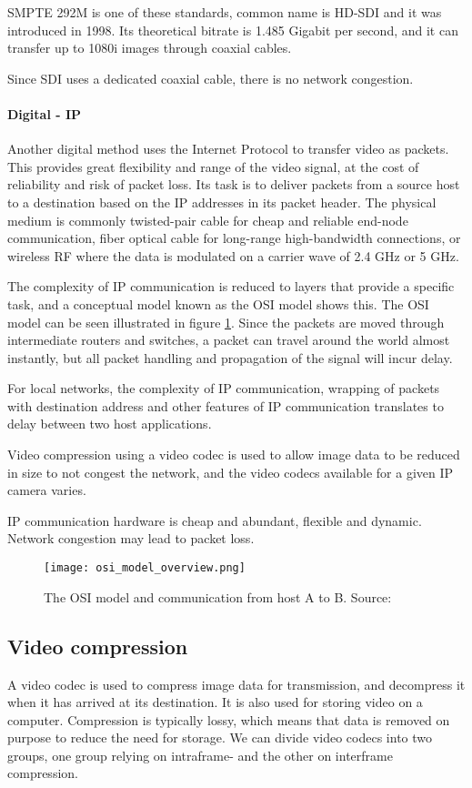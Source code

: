 SMPTE 292M is one of these standards, common name is HD-SDI and it was introduced in 1998. Its theoretical bitrate is 1.485 Gigabit per second, and it can transfer up to 1080i images through coaxial cables.

Since SDI uses a dedicated coaxial cable, there is no network congestion.

\paragraph{Digital - IP}
Another digital method uses the Internet Protocol to transfer video as packets. This provides great flexibility  and range of the video signal, at the cost of reliability and risk of packet loss. Its task is to deliver packets from a source host to a destination based on the IP addresses in its packet header. The physical medium is commonly twisted-pair cable for cheap and reliable end-node communication, fiber optical cable for long-range high-bandwidth connections, or wireless RF where the data is modulated on a carrier wave of 2.4 GHz or 5 GHz.

The complexity of IP communication is reduced to layers that provide a specific task, and a conceptual model known as the OSI model shows this. The OSI model can be seen illustrated in figure \ref{fig:osi_model_overview}. Since the packets are moved through intermediate routers and switches, a packet can travel around the world almost instantly, but all packet handling and propagation of the signal will incur delay.

For local networks, the complexity of IP communication, wrapping of packets with destination address and other features of IP communication translates to delay between two host applications.

Video compression using a video codec is used to allow image data to be reduced in size to not congest the network, and the video codecs available for a given IP camera varies.

IP communication hardware is cheap and abundant, flexible and dynamic. Network congestion may lead to packet loss.

\begin{figure}[ht]
    \centering
    \texttt{[image: osi\_model\_overview.png]}
    \caption{The OSI model and communication from host A to B. Source: \citet{osi15}}
    \label{fig:osi_model_overview}
\end{figure}
\FloatBarrier

\subsection{Video compression}
A video codec is used to compress image data for transmission, and decompress it when it has arrived at its destination. It is also used for storing video on a computer. Compression is typically lossy, which means that data is removed on purpose to reduce the need for storage. We can divide video codecs into two groups, one group relying on intraframe- and the other on interframe compression.

